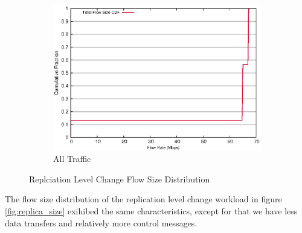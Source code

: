 \begin{figure}[!ht]
\begin{subfigure}[b]{.75\linewidth}
	\includegraphics[width=.99\textwidth]{figures/replica_change/flow_size.eps}
	\caption{All Traffic}\label{fig:read_size:all}
   \end{subfigure}%
\caption{Replciation Level Change Flow Size Distribution}
\end{figure}

The flow size distribution of the replication level change workload in figure \ref{fig:replica_size} exihibed the same characteristics, except for that we have less data transfers and relatively more control messages. 

